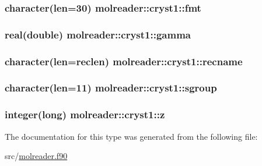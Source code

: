\hypertarget{structmolreader_1_1cryst1_ab6ab864b10676c184026f298e2298135}{
\subsubsection[{fmt}]{\setlength{\rightskip}{0pt plus 5cm}character(len=30) molreader\+::cryst1\+::fmt\hspace{0.3cm}{\ttfamily [private]}}}\label{structmolreader_1_1cryst1_ab6ab864b10676c184026f298e2298135}
\hypertarget{structmolreader_1_1cryst1_a5830f0c34f6ad1c07482a203f7a7b175}{
\subsubsection[{gamma}]{\setlength{\rightskip}{0pt plus 5cm}real(double) molreader\+::cryst1\+::gamma\hspace{0.3cm}{\ttfamily [private]}}}\label{structmolreader_1_1cryst1_a5830f0c34f6ad1c07482a203f7a7b175}
\hypertarget{structmolreader_1_1cryst1_ae85e046760ae97562351b100fd2c9034}{
\subsubsection[{recname}]{\setlength{\rightskip}{0pt plus 5cm}character(len={\bf reclen}) molreader\+::cryst1\+::recname\hspace{0.3cm}{\ttfamily [private]}}}\label{structmolreader_1_1cryst1_ae85e046760ae97562351b100fd2c9034}
\hypertarget{structmolreader_1_1cryst1_a689985667a15167b26dee5b87a240333}{
\subsubsection[{sgroup}]{\setlength{\rightskip}{0pt plus 5cm}character(len=11) molreader\+::cryst1\+::sgroup\hspace{0.3cm}{\ttfamily [private]}}}\label{structmolreader_1_1cryst1_a689985667a15167b26dee5b87a240333}
\hypertarget{structmolreader_1_1cryst1_ae973dda59fd038efc49c8a247e3e71c9}{
\subsubsection[{z}]{\setlength{\rightskip}{0pt plus 5cm}integer(long) molreader\+::cryst1\+::z\hspace{0.3cm}{\ttfamily [private]}}}\label{structmolreader_1_1cryst1_ae973dda59fd038efc49c8a247e3e71c9}


The documentation for this type was generated from the following file\+:\begin{DoxyCompactItemize}
\item 
src/\hyperlink{molreader_8f90}{molreader.\+f90}\end{DoxyCompactItemize}

